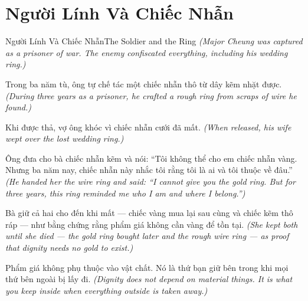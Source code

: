 \section{Người Lính Và Chiếc Nhẫn}
\begin{truyen}{Người Lính Và Chiếc Nhẫn}{The Soldier and the Ring}
\textit{(Major Cheung was captured as a prisoner of war. The enemy confiscated everything, including his wedding ring.)}

Trong ba năm tù, ông tự chế tác một chiếc nhẫn thô từ dây kẽm nhặt được.
\textit{(During three years as a prisoner, he crafted a rough ring from scraps of wire he found.)}

Khi được thả, vợ ông khóc vì chiếc nhẫn cưới đã mất.
\textit{(When released, his wife wept over the lost wedding ring.)}

Ông đưa cho bà chiếc nhẫn kẽm và nói: ``Tôi không thể cho em chiếc nhẫn vàng. Nhưng ba năm nay, chiếc nhẫn này nhắc tôi rằng tôi là ai và tôi thuộc về đâu.''
\textit{(He handed her the wire ring and said: ``I cannot give you the gold ring. But for three years, this ring reminded me who I am and where I belong.'')}

Bà giữ cả hai cho đến khi mất — chiếc vàng mua lại sau cùng và chiếc kẽm thô ráp — như bằng chứng rằng phẩm giá không cần vàng để tồn tại.
\textit{(She kept both until she died — the gold ring bought later and the rough wire ring — as proof that dignity needs no gold to exist.)}

\end{truyen}

\begin{baihoc}
Phẩm giá không phụ thuộc vào vật chất. Nó là thứ bạn giữ bên trong khi mọi thứ bên ngoài bị lấy đi.
\textit{(Dignity does not depend on material things. It is what you keep inside when everything outside is taken away.)}
\end{baihoc}
\ngancach

